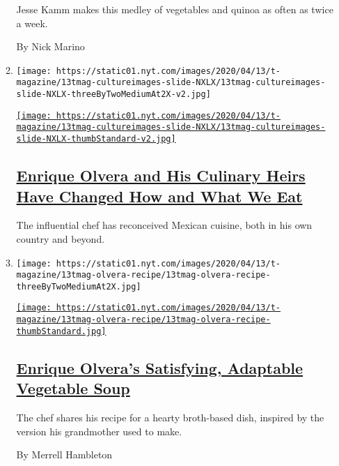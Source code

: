 \begin{enumerate}
\begin{enumerate}
    Jesse Kamm makes this medley of vegetables and quinoa as often as
    twice a week.

    By Nick Marino
  \item
    \texttt{[image: https://static01.nyt.com/images/2020/04/13/t-magazine/13tmag-cultureimages-slide-NXLX/13tmag-cultureimages-slide-NXLX-threeByTwoMediumAt2X-v2.jpg]}

    \href{/interactive/2020/04/13/t-magazine/enrique-olvera-chef.html}{\texttt{[image: https://static01.nyt.com/images/2020/04/13/t-magazine/13tmag-cultureimages-slide-NXLX/13tmag-cultureimages-slide-NXLX-thumbStandard-v2.jpg]}}

    \hypertarget{enrique-olvera-and-his-culinary-heirs-have-changed-how-and-what-we-eat}{%
    \subsection{\texorpdfstring{\href{/interactive/2020/04/13/t-magazine/enrique-olvera-chef.html}{Enrique
    Olvera and His Culinary Heirs Have Changed How and What We
    Eat}}{Enrique Olvera and His Culinary Heirs Have Changed How and What We Eat}}\label{enrique-olvera-and-his-culinary-heirs-have-changed-how-and-what-we-eat}}

    The influential chef has reconceived Mexican cuisine, both in his
    own country and beyond.
  \item
    \texttt{[image: https://static01.nyt.com/images/2020/04/13/t-magazine/13tmag-olvera-recipe/13tmag-olvera-recipe-threeByTwoMediumAt2X.jpg]}

    \href{/2020/04/13/t-magazine/enrique-olvera-vegetable-soup-recipe.html}{\texttt{[image: https://static01.nyt.com/images/2020/04/13/t-magazine/13tmag-olvera-recipe/13tmag-olvera-recipe-thumbStandard.jpg]}}

    \hypertarget{enrique-olveras-satisfying-adaptable-vegetable-soup}{%
    \subsection{\texorpdfstring{\href{/2020/04/13/t-magazine/enrique-olvera-vegetable-soup-recipe.html}{Enrique
    Olvera's Satisfying, Adaptable Vegetable
    Soup}}{Enrique Olvera's Satisfying, Adaptable Vegetable Soup}}\label{enrique-olveras-satisfying-adaptable-vegetable-soup}}

    The chef shares his recipe for a hearty broth-based dish, inspired
    by the version his grandmother used to make.

    By Merrell Hambleton
  \end{enumerate}
\end{enumerate}

